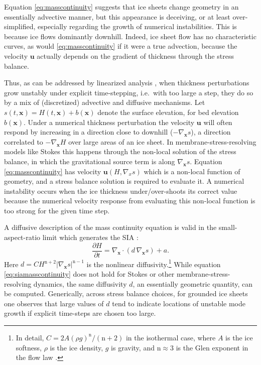 \documentclass[twocolumn,letterpaper]{igs}
\newcommand\bu{\mathbf{u}}
\newcommand\bx{\mathbf{x}}
\newcommand{\grad}{\nabla}
\newcommand{\Divx}{\nabla_\bx \cdot}
\newcommand{\gradx}{\nabla_\bx}
\begin{document}
Equation \eqref{eq:masscontinuity} suggests that ice sheets change geometry in an essentially advective manner, but this appearance is deceiving, or at least over-simplified, especially regarding the growth of numerical instabilities.  This is because ice flows dominantly downhill.  Indeed, ice sheet flow has no characteristic curves, as would \eqref{eq:masscontinuity} if it were a true advection, because the velocity $\bu$ actually depends on the gradient of thickness through the stress balance.

Thus, as can be addressed by linearized analysis \citep{Robinsonetal2022}, when thickness perturbations grow unstably under explicit time-stepping, i.e.~with too large a step, they do so by a mix of (discretized) advective and diffusive mechanisms.  Let $s(t,\bx)=H(t,\bx)+b(\bx)$ denote the surface elevation, for bed elevation $b(\bx)$.  Under a numerical thickness perturbation the velocity $\bu$ will often respond by increasing in a direction close to downhill ($-\gradx s$), a direction correlated to $-\gradx H$ over large areas of an ice sheet.  In membrane-stress-resolving models like Stokes this happens through the non-local solution of the stress balance, in which the gravitational source term is along $\gradx s$.  Equation \eqref{eq:masscontinuity} has velocity $\bu(H,\grad_x s)$ which is a non-local function of geometry, and a stress balance solution is required to evaluate it.  A numerical instability occurs when the ice thickness under/over-shoots its correct value because the numerical velocity response from evaluating this non-local function is too strong for the given time step.

\newcommand{\nn}{\text{n}}
A diffusive description of the mass continuity equation is valid in the small-aspect-ratio limit which generates the SIA \citep{SchoofHewitt2013}:
\begin{equation}
\frac{\partial H}{\partial t} = \Divx \left(d\, \gradx s \right) + a. \label{eq:siamasscontinuity}
\end{equation}
Here $d = C H^{\nn+2} |\gradx s|^{\nn-1}$ is the nonlinear diffusivity.\footnote{In detail, $C = 2 A (\rho g)^\nn/(\nn+2)$ in the isothermal case, where $A$ is the ice softness, $\rho$ is the ice density, $g$ is gravity, and $\nn\approx 3$ is the Glen exponent in the flow law \citep{GreveBlatter2009}.}  While equation \eqref{eq:siamasscontinuity} does not hold for Stokes or other membrane-stress-resolving dynamics, the same diffusivity $d$, an essentially geometric quantity, can be computed.  Generically, across stress balance choices, for grounded ice sheets one observes that large values of $d$ tend to indicate locations of unstable mode growth if explicit time-steps are chosen too large.
\end{document}
